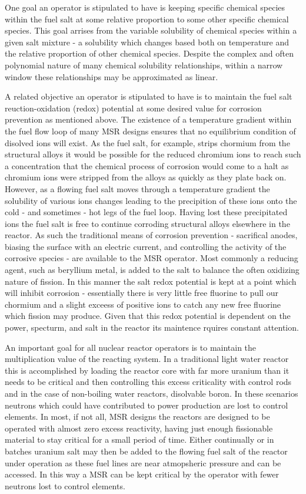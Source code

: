 One goal an operator is stipulated to have is keeping specific chemical
species within the fuel salt at some relative proportion to some other
specific chemical species. This goal arrises from the variable solubility of
chemical species within a given salt mixture - a solubility which changes
based both on temperature and the relative proportion of other chemical species.
Despite the complex and often polynomial nature of many chemical solubility
relationships, within a narrow window these relationships may be approximated
as linear.

A related objective an operator is stipulated to have is to maintain the fuel
salt reuction-oxidation (redox) potential at some desired value for corrosion
prevention as mentioned above. The existence of a temperature gradient within
the fuel flow loop of many MSR designs ensures that no equilibrium condition of
disolved ions will exist. As the fuel salt, for example, strips chormium from
the structural alloys it would be possible for the reduced chromium ions to
reach such a concentration that the chemical process of corrosion would come to
a halt as chromium ions were stripped from the alloys as quickly as they
plate back on. However, as a flowing fuel salt moves through a temperature
gradient the solubility of various ions changes leading to the precipition of
these ions onto the cold - and sometimes - hot legs of the fuel loop. Having
lost these precipitated ions the fuel salt is free to continue corroding
structural alloys elsewhere in the reactor. As such the traditional means of 
corrosion prevention - sacrifical anodes, biasing the surface with an electric
current, and controlling the activity of the corrosive species - are available
to the MSR operator. Most commonly a reducing agent, such as beryllium metal,
is added to the salt to balance the often oxidizing nature of fission. In
this manner the salt redox potential is kept at a point which will inhibit
corrosion - essentially there is very little free fluorine to pull our chormium
and a slight exceess of positive ions to catch any new free fluorine which
fission may produce. Given that this redox potential is dependent on the power,
specturm, and salt in the reactor its maintence rquires constant attention.

An important goal for all nuclear reactor
operators is to maintain the multiplication value of the reacting system. In a
traditional light water reactor this is accomplished by loading the reactor
core with far more uranium than it needs to be critical and then controlling
this excess criticality with control rods and in the case of non-boiling water
reactors, disolvable boron. In these scenarios neutrons which could have
contributed to power production are lost to control elements. In most, if not
all, MSR designs the reactors are designed to be operated with almost zero
excess reactivity, having just enough fissionable material to stay critical for
a small period of time. Either continually or in batches uranium salt may then
be added to the flowing fuel salt of the reactor under operation as these fuel
lines are near atmopsheric pressure and can be accessed. In this way a MSR can
be kept critical by the operator with fewer neutrons lost to control elements.

